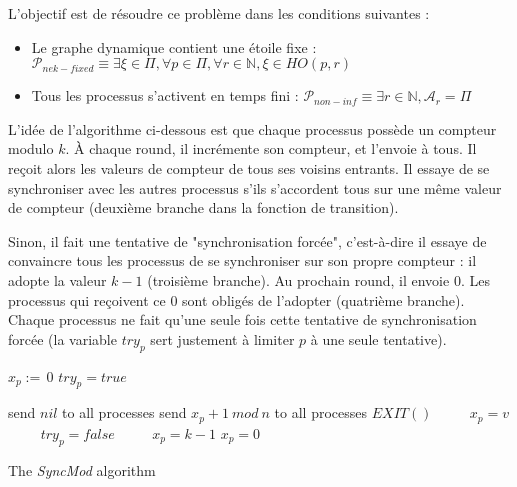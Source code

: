 \documentclass{article}
\begin{document}
L'objectif est de résoudre ce problème dans les conditions suivantes :
\begin{itemize}

	\item Le graphe dynamique contient une étoile fixe : $\mathcal{P}_{nek-fixed} \equiv \exists \xi \in \Pi, \forall p \in \Pi, \forall r \in \mathds{N}, \xi \in HO(p, r)$
	\item Tous les processus s'activent en temps fini : $\mathcal{P}_{non-inf} \equiv \exists r \in \mathds{N}, \mathcal{A}_r = \Pi$

\end{itemize}

L'idée de l'algorithme ci-dessous est que chaque processus possède un compteur modulo $k$. À chaque round, il incrémente son compteur, et l'envoie à tous.
Il reçoit alors les valeurs de compteur de tous ses voisins entrants. Il essaye de se synchroniser avec les autres processus s'ils s'accordent tous sur une même valeur de compteur
(deuxième branche dans la fonction de transition).

Sinon, il fait une tentative de "synchronisation forcée", c'est-à-dire il essaye de convaincre tous les processus de se synchroniser sur son propre compteur :
il adopte la valeur $k-1$ (troisième branche). Au prochain round, il envoie 0.  Les processus qui reçoivent ce 0 sont obligés de l'adopter (quatrième branche).
Chaque processus ne fait qu'une seule fois cette tentative de synchronisation forcée (la variable $try_p$ sert justement à limiter $p$ à une seule tentative).

\pagebreak[1]

\begin{algorithm}[htb]
\begin{distribalgo}[1]
\BLANK {}
  \STATE $x_p :=\, 0$ 
  \STATE $try_p = true$

\ENDINDENT \BLANK

    \STATE send $nil$ to all processes
  \ENDINDENT
\ENDINDENT
  \BLANK
{}
    \STATE send $x_p+1~mod~n$ to all processes
  \ENDINDENT
\ENDINDENT
  \BLANK
{}
	\STATE $EXIT()$ ~~~~
	\STATE $x_p = v$ ~~~~
	\STATE $try_p = false$ ~~~~
	\STATE $x_p = k - 1$
	\ELSE
	\STATE $x_p = 0$ ~~~~
	\ENDIF
  \ENDINDENT
\ENDINDENT 
\caption{The {\em SyncMod} algorithm} \label{algo:R}
\end{distribalgo}

\end{algorithm}
\end{document}
